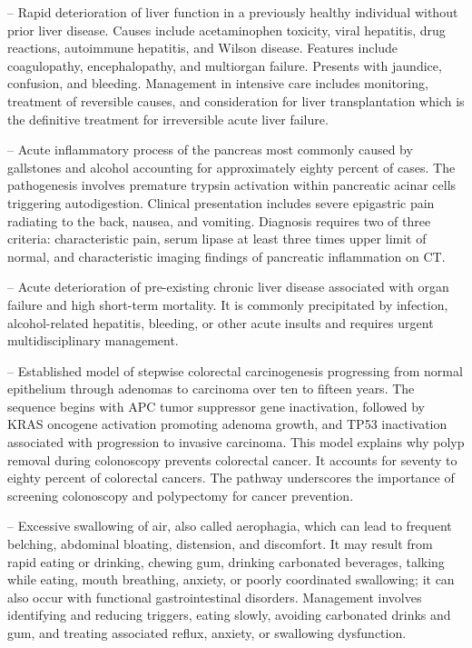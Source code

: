 -- Rapid deterioration of liver function in a previously healthy individual without prior liver disease. Causes include acetaminophen toxicity, viral hepatitis, drug reactions, autoimmune hepatitis, and Wilson disease. Features include coagulopathy, encephalopathy, and multiorgan failure. Presents with jaundice, confusion, and bleeding. Management in intensive care includes monitoring, treatment of reversible causes, and consideration for liver transplantation which is the definitive treatment for irreversible acute liver failure.

-- Acute inflammatory process of the pancreas most commonly caused by gallstones and alcohol accounting for approximately eighty percent of cases. The pathogenesis involves premature trypsin activation within pancreatic acinar cells triggering autodigestion. Clinical presentation includes severe epigastric pain radiating to the back, nausea, and vomiting. Diagnosis requires two of three criteria: characteristic pain, serum lipase at least three times upper limit of normal, and characteristic imaging findings of pancreatic inflammation on CT.

-- Acute deterioration of pre-existing chronic liver disease associated with organ failure and high short-term mortality. It is commonly precipitated by infection, alcohol-related hepatitis, bleeding, or other acute insults and requires urgent multidisciplinary management.

-- Established model of stepwise colorectal carcinogenesis progressing from normal epithelium through adenomas to carcinoma over ten to fifteen years. The sequence begins with APC tumor suppressor gene inactivation, followed by KRAS oncogene activation promoting adenoma growth, and TP53 inactivation associated with progression to invasive carcinoma. This model explains why polyp removal during colonoscopy prevents colorectal cancer. It accounts for seventy to eighty percent of colorectal cancers. The pathway underscores the importance of screening colonoscopy and polypectomy for cancer prevention.

-- Excessive swallowing of air, also called aerophagia, which can lead to frequent belching, abdominal bloating, distension, and discomfort. It may result from rapid eating or drinking, chewing gum, drinking carbonated beverages, talking while eating, mouth breathing, anxiety, or poorly coordinated swallowing; it can also occur with functional gastrointestinal disorders. Management involves identifying and reducing triggers, eating slowly, avoiding carbonated drinks and gum, and treating associated reflux, anxiety, or swallowing dysfunction.

